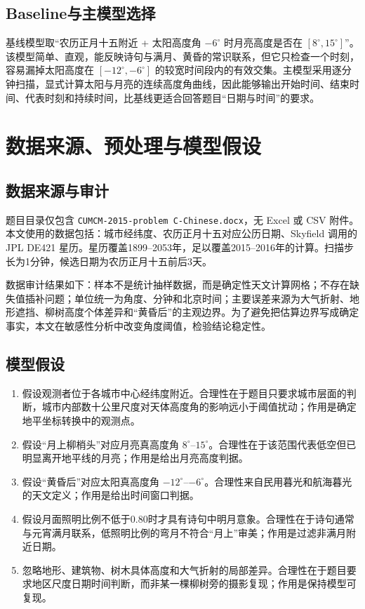 \documentclass[UTF8,a4paper,12pt]{ctexart}
\begin{document}
\subsection{Baseline与主模型选择}
基线模型取“农历正月十五附近 + 太阳高度角 $-6^\circ$ 时月亮高度是否在 $[8^\circ,15^\circ]$”。该模型简单、直观，能反映诗句与满月、黄昏的常识联系，但它只检查一个时刻，容易漏掉太阳高度在 $[-12^\circ,-6^\circ]$ 的较宽时间段内的有效交集。主模型采用逐分钟扫描，显式计算太阳与月亮的连续高度角曲线，因此能够输出开始时间、结束时间、代表时刻和持续时间，比基线更适合回答题目“日期与时间”的要求。

\section{数据来源、预处理与模型假设}
\subsection{数据来源与审计}
题目目录仅包含 \texttt{CUMCM-2015-problem C-Chinese.docx}，无 Excel 或 CSV 附件。本文使用的数据包括：城市经纬度、农历正月十五对应公历日期、Skyfield 调用的 JPL DE421 星历。星历覆盖1899--2053年，足以覆盖2015--2016年的计算。扫描步长为1分钟，候选日期为农历正月十五前后3天。

数据审计结果如下：样本不是统计抽样数据，而是确定性天文计算网格；不存在缺失值插补问题；单位统一为角度、分钟和北京时间；主要误差来源为大气折射、地形遮挡、柳树高度个体差异和“黄昏后”的主观边界。为了避免把估算边界写成确定事实，本文在敏感性分析中改变角度阈值，检验结论稳定性。

\subsection{模型假设}
\begin{enumerate}
\item 假设观测者位于各城市中心经纬度附近。合理性在于题目只要求城市层面的判断，城市内部数十公里尺度对天体高度角的影响远小于阈值扰动；作用是确定地平坐标转换中的观测点。
\item 假设“月上柳梢头”对应月亮真高度角 $8^\circ$--$15^\circ$。合理性在于该范围代表低空但已明显离开地平线的月亮；作用是给出月亮高度判据。
\item 假设“黄昏后”对应太阳真高度角 $-12^\circ$--$-6^\circ$。合理性来自民用暮光和航海暮光的天文定义；作用是给出时间窗口判据。
\item 假设月面照明比例不低于0.80时才具有诗句中明月意象。合理性在于诗句通常与元宵满月联系，低照明比例的弯月不符合“月上”审美；作用是过滤非满月附近日期。
\item 忽略地形、建筑物、树木具体高度和大气折射的局部差异。合理性在于题目要求地区尺度日期时间判断，而非某一棵柳树旁的摄影复现；作用是保持模型可复现。
\end{enumerate}
\end{document}
